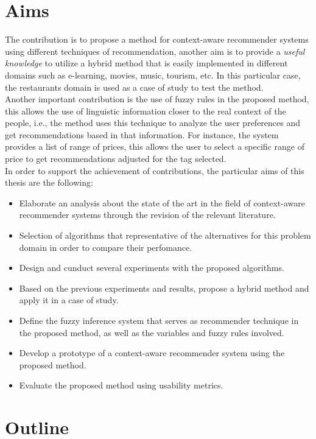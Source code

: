 \section{Aims}

The contribution is to propose a method for context-aware recommender
systems using different techniques of recommendation, another aim is
to provide a \textit{useful knowledge} to utilize a hybrid method that
is easily implemented in different domains such as e-learning, movies,
music, tourism, etc. In this particular case, the restaurants domain
is used as a case of study to test the method.\\
Another important contribution is the use of fuzzy rules in the
proposed method, this allows the use of linguistic information closer
to the real context of the people, i.e., the method uses this
technique to analyze the user preferences and get recommendations
based in that information. For instance, the system provides a list of
range of prices, this allows the user to select a specific range of
price to get recommendations adjusted for the tag selected.\\ In order
to support the achievement of contributions, the particular aims of
this thesis are the following:
\begin{itemize}  
\item Elaborate an analysis about the state of the art in the field
of context-aware recommender systems through  the revision of 
the relevant literature. 
\item Selection of algorithms that representative of the alternatives for
this problem domain in order to compare their perfomance.
\item Design and cunduct several experiments with the proposed 
algorithms.
\item Based on the previous experiments and results, propose a hybrid
method and apply it in a case of study.
\item Define the fuzzy inference system that serves as recommender
technique in the proposed method, as well as the variables and fuzzy
rules involved.
\item Develop a prototype of a context-aware recommender system 
using the proposed method.
\item Evaluate the proposed method using usability metrics.
\end{itemize} 

\section{Outline}


